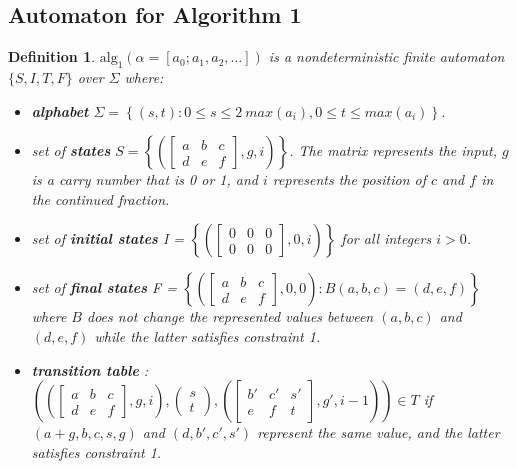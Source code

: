 \documentclass[landscape]{sciposter}
\newtheorem*{definition}{Definition}
\begin{document}
\begin{multicols}{3}
\begin{mdframed}[style=MyFrame]
\subsection*{Automaton for Algorithm 1}
\end{mdframed}
    \begin{definition}
    $\text{alg}_1(\alpha = [a_0; a_1,a_2,\dots])$ is a nondeterministic finite automaton $\{S,I,T,F\}$ over $\Sigma$ where:
    \begin{itemize}
    \item \textbf{alphabet} $\Sigma = \left\{(s,t) : 0\le s \le 2 ~max(a_i),0\le t \le max(a_i) \right\}$.
   \item set of \textbf{states} $S = \left\{\left(\begin{bmatrix}a&b&c\\d&e&f\end{bmatrix},g,i\right)\right\}$. The matrix represents the input, $g$ is a carry number that is 0 or 1, and $i$ represents the position of $c$ and $f$ in the continued fraction.
   \item set of \textbf{initial states} I = $\left\{\left(\begin{bmatrix}0&0&0\\0&0&0\end{bmatrix},0,i\right)\right\}$ for all integers $i> 0$.
   \item set of \textbf{final states} F = $\left\{\left(\begin{bmatrix}a&b&c\\d&e&f\end{bmatrix},0,0\right):B(a,b,c)=(d,e,f)\right\}$ where $B$ does not change the represented values between $(a,b,c)$ and $(d,e,f)$ while the latter satisfies constraint 1.
   \item \textbf{transition table} :  $\left(\left(\begin{bmatrix}a&b&c\\d&e&f\end{bmatrix},g,i\right), \begin{pmatrix}s\\t\end{pmatrix}, \left(\begin{bmatrix}b'&c'&s'\\e&f&t\end{bmatrix},g',i-1\right)  \right) \in T$ if $(a+g,b,c,s,g)$ and $(d,b',c',s')$ represent the same value, and the latter satisfies constraint 1.
   \end{itemize}
\end{definition}

\end{multicols}
\end{document}
